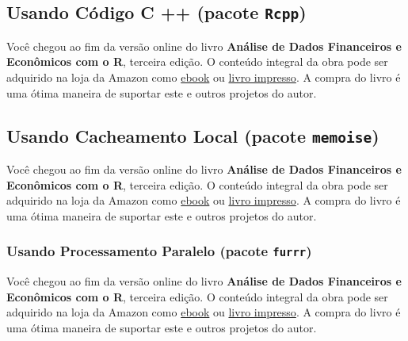 \documentclass[
  11pt,
]{book}
\newenvironment{pleasebuyit}
{\begin{noteblock}
		
	} {\end{noteblock}}
\begin{document}
\hypertarget{usando-cuxf3digo-c-pacote-rcpp}{%
\subsection{\texorpdfstring{Usando Código C ++ (pacote \texttt{Rcpp})}{Usando Código C ++ (pacote Rcpp)}}\label{usando-cuxf3digo-c-pacote-rcpp}}

\begin{pleasebuyit}
Você chegou ao fim da versão online do livro \textbf{Análise de Dados
Financeiros e Econômicos com o R}, terceira edição. O conteúdo integral
da obra pode ser adquirido na loja da Amazon como
\href{https://www.amazon.com.br/dp/B08WNC27ZY}{ebook} ou
\href{https://www.amazon.com/dp/B08WP8CCDB}{livro impresso}. A compra do
livro é uma ótima maneira de suportar este e outros projetos do autor.
\end{pleasebuyit}

\hypertarget{usando-cacheamento-local-pacote-memoise}{%
\subsection{\texorpdfstring{Usando Cacheamento Local (pacote \texttt{memoise})}{Usando Cacheamento Local (pacote memoise)}}\label{usando-cacheamento-local-pacote-memoise}}

\begin{pleasebuyit}
Você chegou ao fim da versão online do livro \textbf{Análise de Dados
Financeiros e Econômicos com o R}, terceira edição. O conteúdo integral
da obra pode ser adquirido na loja da Amazon como
\href{https://www.amazon.com.br/dp/B08WNC27ZY}{ebook} ou
\href{https://www.amazon.com/dp/B08WP8CCDB}{livro impresso}. A compra do
livro é uma ótima maneira de suportar este e outros projetos do autor.
\end{pleasebuyit}

\hypertarget{usando-processamento-paralelo-pacote-furrr}{%
\subsubsection{\texorpdfstring{Usando Processamento Paralelo (pacote \texttt{furrr})}{Usando Processamento Paralelo (pacote furrr)}}\label{usando-processamento-paralelo-pacote-furrr}}

\begin{pleasebuyit}
Você chegou ao fim da versão online do livro \textbf{Análise de Dados
Financeiros e Econômicos com o R}, terceira edição. O conteúdo integral
da obra pode ser adquirido na loja da Amazon como
\href{https://www.amazon.com.br/dp/B08WNC27ZY}{ebook} ou
\href{https://www.amazon.com/dp/B08WP8CCDB}{livro impresso}. A compra do
livro é uma ótima maneira de suportar este e outros projetos do autor.
\end{pleasebuyit}
\end{document}
